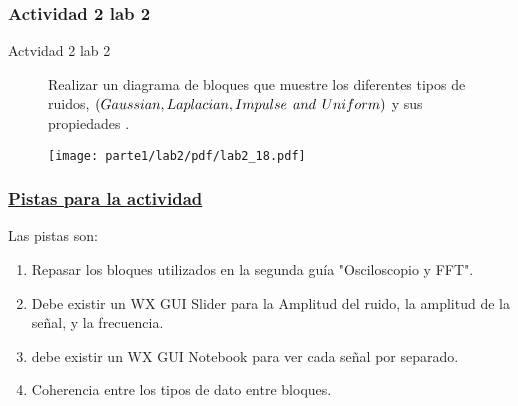 \subsubsection{Actividad 2 lab 2}

\begin{frame}{Actvidad 2 lab 2}
\begin{figure}[H]
\begin{flushleft}
\item{Realizar un diagrama de  bloques que  muestre los diferentes tipos de  ruidos, $(Gaussian, Laplacian, Impulse \hspace{0.15cm} and  \hspace{0.15cm} Uniform)$ y sus  propiedades .}\\
\end{flushleft}
	

	

\begin{center}
\centering
\texttt{[image: parte1/lab2/pdf/lab2\_18.pdf]}
\end{center}
\end{figure}
\end{frame}


\begin{frame}

\frametitle{\underline{\textbf{Pistas para la actividad}}}

Las pistas son:
\begin{enumerate}[1.]

\item {Repasar los bloques utilizados en la segunda  guía "Osciloscopio y FFT".}\\
\item {Debe existir un WX GUI Slider  para la Amplitud del  ruido, la  amplitud de  la señal, y la frecuencia.}\\
\item {debe existir un WX GUI Notebook para ver cada  señal  por  separado.}\\
\item {Coherencia entre los tipos de dato entre bloques.}\\


\end{enumerate}
\end{frame}

